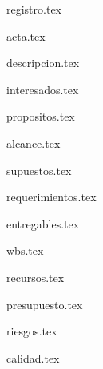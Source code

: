 \documentclass[12pt]{proyecto}
\begin{document}
\maketitle
\thispagestyle{empty}
\pagebreak


\thispagestyle{empty}
{\setlength{\parskip}{0pt}
\tableofcontents{}
}
\pagebreak


{registro.tex}

{acta.tex}

{descripcion.tex} %

{interesados.tex} %

{propositos.tex}

{alcance.tex} %

{supuestos.tex}

{requerimientos.tex} %


{entregables.tex} %

{wbs.tex}

{recursos.tex}

{presupuesto.tex}
 

{riesgos.tex} %

{calidad.tex} %




\end{document}
